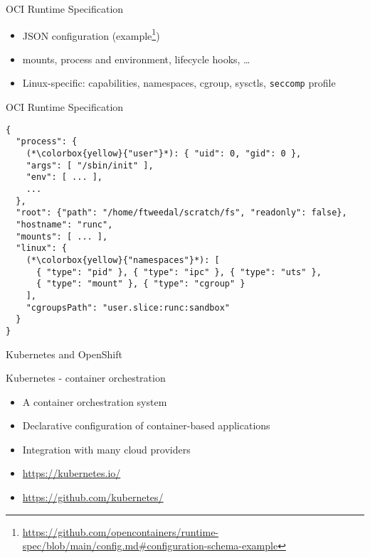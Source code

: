 \documentclass[ignorenonframetext,aspectratio=169,12pt]{beamer}
\begin{document}
\begin{frame}{OCI Runtime Specification}
\protect\hypertarget{oci-runtime-spec}{}
\begin{itemize}
\item JSON configuration (example\footnote{\url{https://github.com/opencontainers/runtime-spec/blob/main/config.md\#configuration-schema-example}})
\item mounts, process and environment, lifecycle hooks, \ldots{}
\item Linux-specific: capabilities, namespaces, cgroup, sysctls,
      {\tt seccomp} profile
\end{itemize}
\end{frame}

\begin{frame}[fragile]{OCI Runtime Specification}
\protect\hypertarget{kubernetes-pod-spec-example}{}
\begin{lstlisting}[basicstyle=\ttfamily\footnotesize]
{
  "process": {
    (*\colorbox{yellow}{"user"}*): { "uid": 0, "gid": 0 },
    "args": [ "/sbin/init" ],
    "env": [ ... ],
    ...
  },
  "root": {"path": "/home/ftweedal/scratch/fs", "readonly": false},
  "hostname": "runc",
  "mounts": [ ... ],
  "linux": {
    (*\colorbox{yellow}{"namespaces"}*): [
      { "type": "pid" }, { "type": "ipc" }, { "type": "uts" },
      { "type": "mount" }, { "type": "cgroup" }
    ],
    "cgroupsPath": "user.slice:runc:sandbox"
  }
}
\end{lstlisting}
\end{frame}



\begin{frame}[plain]
\centering
\huge Kubernetes and OpenShift
\end{frame}


\begin{frame}{Kubernetes - container orchestration}
\protect\hypertarget{kubernetes-intro}{}

\begin{itemize}
\item A container orchestration system
\item Declarative configuration of container-based applications
\item Integration with many cloud providers
\item \url{https://kubernetes.io/}
\item \url{https://github.com/kubernetes/}
\end{itemize}

\end{frame}
\end{document}
